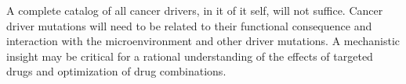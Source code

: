 A complete catalog of all cancer drivers, in it of it self, will not suffice. Cancer driver mutations will need to be related to their functional consequence and interaction with the microenvironment and other driver mutations. A mechanistic insight may be critical for a rational understanding of the effects of targeted drugs and optimization of drug combinations.

